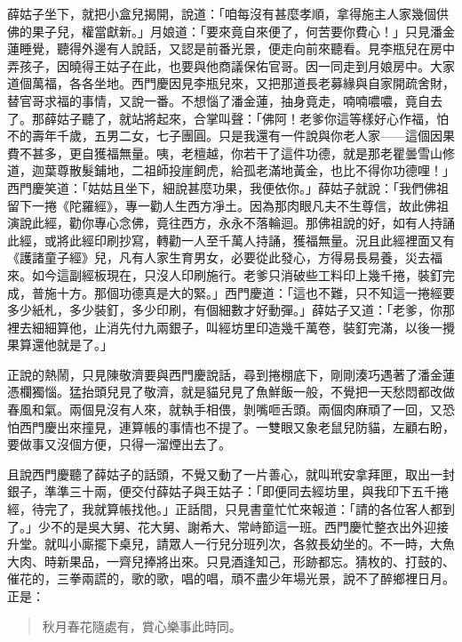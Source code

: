 薛姑子坐下，就把小盒兒揭開，說道：「咱每沒有甚麼孝順，拿得施主人家幾個供佛的果子兒，權當獻新。」月娘道：「要來竟自來便了，何苦要你費心！」只見潘金蓮睡覺，聽得外邊有人說話，又認是前番光景，便走向前來聽看。見李瓶兒在房中弄孩子，因曉得王姑子在此，也要與他商議保佑官哥。因一同走到月娘房中。大家道個萬福，各各坐地。西門慶因見李瓶兒來，又把那道長老募緣與自家開疏舍財，替官哥求福的事情，又說一番。不想惱了潘金蓮，抽身竟走，喃喃噥噥，竟自去了。那薛姑子聽了，就站將起來，合掌叫聲：「佛阿！老爹你這等樣好心作福，怕不的壽年千歲，五男二女，七子團圓。只是我還有一件說與你老人家——這個因果費不甚多，更自獲福無量。咦，老檀越，你若干了這件功德，就是那老瞿曇雪山修道，迦葉尊散髮鋪地，二祖師投崖飼虎，給孤老滿地黃金，也比不得你功德哩！」西門慶笑道：「姑姑且坐下，細說甚麼功果，我便依你。」薛姑子就說：「我們佛祖留下一捲《陀羅經》，專一勸人生西方凈土。因為那肉眼凡夫不生尊信，故此佛祖演說此經，勸你專心念佛，竟往西方，永永不落輪迴。那佛祖說的好，如有人持誦此經，或將此經印刷抄寫，轉勸一人至千萬人持誦，獲福無量。況且此經裡面又有《護諸童子經》兒，凡有人家生育男女，必要從此發心，方得易長易養，災去福來。如今這副經板現在，只沒人印刷施行。老爹只消破些工料印上幾千捲，裝釘完成，普施十方。那個功德真是大的緊。」西門慶道：「這也不難，只不知這一捲經要多少紙札，多少裝釘，多少印刷，有個細數才好動彈。」薛姑子又道：「老爹，你那裡去細細算他，止消先付九兩銀子，叫經坊里印造幾千萬卷，裝釘完滿，以後一攪果算還他就是了。」

正說的熱鬧，只見陳敬濟要與西門慶說話，尋到捲棚底下，剛剛湊巧遇著了潘金蓮憑欄獨惱。猛抬頭兒見了敬濟，就是貓兒見了魚鮮飯一般，不覺把一天愁悶都改做春風和氣。兩個見沒有人來，就執手相偎，剝嘴咂舌頭。兩個肉麻頑了一回，又恐怕西門慶出來撞見，連算帳的事情也不提了。一雙眼又象老鼠兒防貓，左顧右盼，要做事又沒個方便，只得一溜煙出去了。

且說西門慶聽了薛姑子的話頭，不覺又動了一片善心，就叫玳安拿拜匣，取出一封銀子，準準三十兩，便交付薛姑子與王姑子：「即便同去經坊里，與我印下五千捲經，待完了，我就算帳找他。」正話間，只見書童忙忙來報道：「請的各位客人都到了。」少不的是吳大舅、花大舅、謝希大、常峙節這一班。西門慶忙整衣出外迎接升堂。就叫小廝擺下桌兒，請眾人一行兒分班列次，各敘長幼坐的。不一時，大魚大肉、時新果品，一齊兒捧將出來。只見酒逢知己，形跡都忘。猜枚的、打鼓的、催花的，三拳兩謊的，歌的歌，唱的唱，頑不盡少年場光景，說不了醉鄉裡日月。正是：
\begin{quote}
秋月春花隨處有，賞心樂事此時同。
\end{quote}
